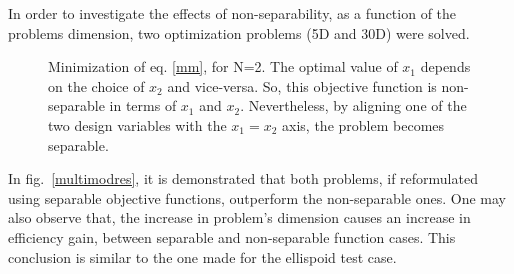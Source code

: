 In order to investigate the effects of non-separability, as a function of the problems dimension, two optimization problems (5D and 30D) were solved.  
\begin{figure}[h!]
\begin{minipage}[b]{1\linewidth}
 \centering
\end{minipage}
\caption{Minimization of eq. \ref{mm}, for N=2. The optimal value of $x_1$  depends on the choice of $x_2$ and vice-versa. So, this objective function is non-separable in terms of $x_1$ and $x_2$. Nevertheless, by aligning one of the two design variables with the $x_1\!=\!x_2$ axis, the problem becomes separable.} 

\label{multimod}
\end{figure}

In fig.\ \ref{multimodres}, it is demonstrated that both problems, if reformulated using  separable objective functions, outperform the non-separable ones. One may also observe that, the increase in problem's dimension causes an increase in efficiency gain, between separable and non-separable function cases. This conclusion is similar to the one made for the ellispoid test case. 



